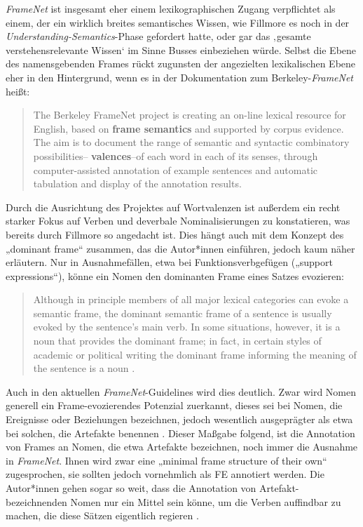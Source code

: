 \emph{FrameNet} ist insgesamt eher einem lexikographischen Zugang verpflichtet als einem, der ein wirklich breites semantisches Wissen, wie Fillmore es noch in der \emph{Understanding-Semantics}-Phase gefordert hatte, oder gar das ‚gesamte verstehensrelevante Wissen` im Sinne Busses einbeziehen würde. Selbst die Ebene des namensgebenden Frames rückt zugunsten der angezielten lexikalischen Ebene eher in den Hintergrund, wenn es in der Dokumentation zum Berkeley-\emph{FrameNet} heißt:

\begin{quote}
The Berkeley FrameNet project is creating an on-line lexical resource for English, based on \textbf{frame semantics} and supported by corpus evidence. The aim is to document the range of semantic and syntactic combinatory possibilities-- \textbf{valences}--of each word in each of its senses, through computer-assisted annotation of example sentences and automatic tabulation and display of the annotation results. \autocite[7]{ruppenhoferFrameNetIIExtended2016}
\end{quote}

Durch die Ausrichtung des Projektes auf Wortvalenzen ist außerdem ein recht starker Fokus auf Verben und deverbale Nominalisierungen zu konstatieren, was bereits durch Fillmore so angedacht ist. Dies hängt auch mit dem Konzept des „dominant frame`` \autocite[324]{fillmoreFramenetActionCase2003} zusammen, das die Autor*innen einführen, jedoch kaum näher erläutern. Nur in Ausnahmefällen, etwa bei Funktionsverbgefügen („support expressions``), könne ein Nomen den dominanten Frame eines Satzes evozieren:

\begin{quote}
Although in principle members of all major lexical categories can evoke a semantic frame, the dominant semantic frame of a sentence is usually evoked by the sentence's main verb. In some situations, however, it is a noun that provides the dominant frame; in fact, in certain styles of academic or political writing the dominant frame informing the meaning of the sentence is a noun \autocite[324]{fillmoreFramenetActionCase2003}.
\end{quote}

Auch in den aktuellen \emph{FrameNet}-Guidelines wird dies deutlich. Zwar wird Nomen generell ein Frame-evozierendes Potenzial zuerkannt, dieses sei bei Nomen, die Ereignisse oder Beziehungen bezeichnen, jedoch wesentlich ausgeprägter als etwa bei solchen, die Artefakte benennen \autocite[43]{ruppenhoferFrameNetIIExtended2016}. Dieser Maßgabe folgend, ist die Annotation von Frames an Nomen, die etwa Artefakte bezeichnen, noch immer die Ausnahme in \emph{FrameNet}. Ihnen wird zwar eine „minimal frame structure of their own`` \autocite[8]{ruppenhoferFrameNetIIExtended2016} zugesprochen, sie sollten jedoch vornehmlich als FE annotiert werden. Die Autor*innen gehen sogar so weit, dass die Annotation von Artefakt-bezeichnenden Nomen nur ein Mittel sein könne, um die Verben auffindbar zu machen, die diese Sätzen eigentlich regieren \autocite[8, siehe auch 51-52]{ruppenhoferFrameNetIIExtended2016}.

